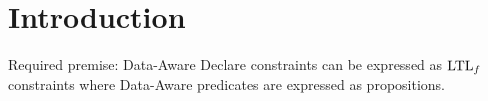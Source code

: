 \section{Introduction}

Required premise: Data-Aware Declare constraints can be expressed as $\textup{LTL}_f$ constraints where Data-Aware predicates are expressed as propositions.